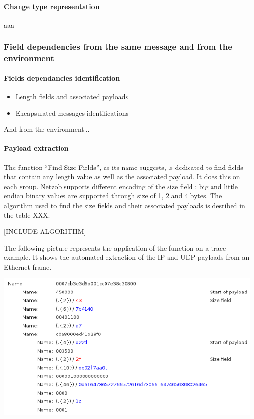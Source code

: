 \documentclass[letterpaper,10pt,english]{sphinxmanual}
\begin{document}
\paragraph{Change type representation}
\label{modelization/vocabular:change-type-representation}
aaa


\subsubsection{Field dependencies from the same message and from the environment}
\label{modelization/vocabular:field-dependencies-from-the-same-message-and-from-the-environment}

\paragraph{Fields dependancies identification}
\label{modelization/vocabular:fields-dependancies-identification}\begin{itemize}
\item {} 
Length fields and associated payloads

\item {} 
Encapsulated messages identifications

\end{itemize}

And from the environment...


\paragraph{Payload extraction}
\label{modelization/vocabular:payload-extraction}
The function ``Find Size Fields'', as its name suggests, is dedicated to find fields that contain any length value as well as the associated payload. It does this on each group. Netzob supports different encoding of the size field : big and little endian binary values are supported through size of 1, 2 and 4 bytes. The algorithm used to find the size fields and their associated payloads is desribed in the table XXX.

{[}INCLUDE ALGORITHM{]}

The following picture represents the application of the function on a trace example. It shows the automated extraction of the IP and UDP payloads from an Ethernet frame.

\includegraphics{payload_extraction.png}
\end{document}
